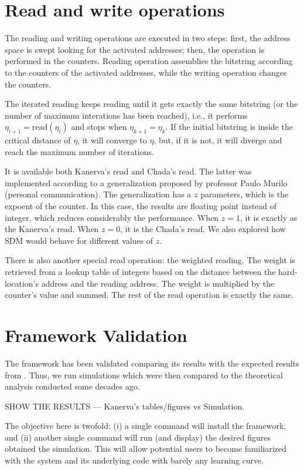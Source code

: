 \section{Read and write operations}

The reading and writing operations are executed in two steps: first, the address space is swept looking for the activated addresses; then, the operation is performed in the counters. Reading operation assemblies the bitstring according to the counters of the activated addresses, while the writing operation changes the counters.

The iterated reading keeps reading until it gets exactly the same bitstring (or the number of maximum interations has been reached), i.e., it performs $\eta_{i+1} = \text{read}(\eta_i)$ and stops when $\eta_{k+1} = \eta_{k}$. If the initial bitstring is inside the critical distance of $\eta$, it will converge to $\eta$, but, if it is not, it will diverge and reach the maximum number of iterations.

It is available both Kanerva's read and Chada's read. The latter was implemented according to a generalization proposed by professor Paulo Murilo (personal communication). The generalization has a $z$ parameters, which is the expoent of the counter. In this case, the results are floating point instead of integer, which reduces considerably the performance. When $z=1$, it is exactly as the Kanerva's read. When $z=0$, it is the Chada's read. We also explored how SDM would behave for different values of $z$.

There is also another special read operation: the weighted reading. The weight is retrieved from a lookup table of integers based on the distance between the hard-location's address and the reading address. The weight is multiplied by the counter's value and summed. The rest of the read operation is exactly the same.



\section{Framework Validation}

The framework has been validated comparing its results with the expected results from \citet{Kanerva1988}. Thus, we run simulations which were then compared to the theoretical analysis conducted some decades ago.

SHOW THE RESULTS --- Kanerva's tables/figures vs Simulation.

The objective here is twofold: (i) a single command will install the framework, and (ii) another single command will run (and display) the desired figures obtained the simulation. This will allow potential users to become familiarized with the system and its underlying code with barely any learning curve.

